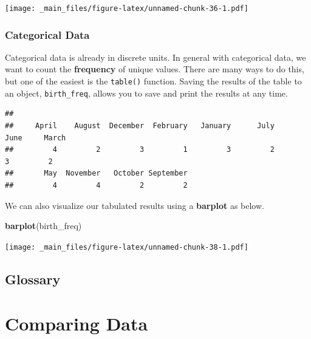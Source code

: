 \documentclass[
]{book}
\newenvironment{Shaded}{\begin{snugshade}}{\end{snugshade}}
\newcommand{\FunctionTok}[1]{\textcolor[rgb]{0.13,0.29,0.53}{\textbf{#1}}}
\newcommand{\NormalTok}[1]{#1}
\newcommand{\OtherTok}[1]{\textcolor[rgb]{0.56,0.35,0.01}{#1}}
\newcommand{\SpecialCharTok}[1]{\textcolor[rgb]{0.81,0.36,0.00}{\textbf{#1}}}
\begin{document}
\texttt{[image: \_main\_files/figure-latex/unnamed-chunk-36-1.pdf]}

\hypertarget{categorical-data}{%
\subsection{Categorical Data}\label{categorical-data}}

Categorical data is already in discrete units. In general with categorical data, we want to count the \textbf{frequency} of unique values. There are many ways to do this, but one of the easiest is the \texttt{table()} function. Saving the results of the table to an object, \texttt{birth\_freq}, allows you to save and print the results at any time.

\begin{Shaded}
\end{Shaded}

\begin{verbatim}
## 
##     April    August  December  February   January      July      June     March 
##         4         2         3         1         3         2         3         2 
##       May  November   October September 
##         4         4         2         2
\end{verbatim}

We can also visualize our tabulated results using a \textbf{barplot} as below.

\begin{Shaded}
\begin{Highlighting}[]
\FunctionTok{barplot}\NormalTok{(birth\_freq)}
\end{Highlighting}
\end{Shaded}

\texttt{[image: \_main\_files/figure-latex/unnamed-chunk-38-1.pdf]}

\hypertarget{glossary-2}{%
\section*{Glossary}\label{glossary-2}}

\hypertarget{comparing-data}{%
\chapter{Comparing Data}\label{comparing-data}}
\end{document}
